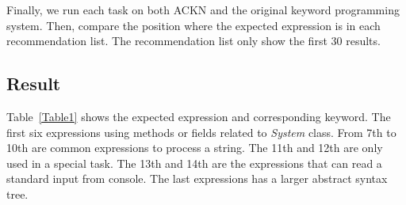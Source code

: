 \documentclass[PRO,english]{ipsj}
\begin{document}
Finally, we run each task on both ACKN and the original keyword programming system. Then, compare the position where the expected expression is in each recommendation list. The recommendation list only show the first 30 results.

\subsection{Result}
Table~\ref{Table1} shows the expected expression and corresponding keyword. The first six expressions using methods or fields related to \textit{System} class. From 7th to 10th are common expressions to process a string. The 11th and 12th are only used in a special task. The 13th and 14th are the expressions that can read a standard input from console. The last expressions has a larger abstract syntax tree.
\end{document}
